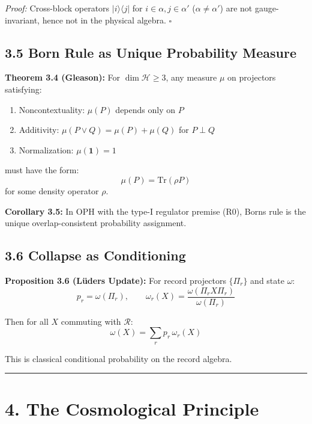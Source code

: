 \emph{Proof:} Cross-block operators \(|i\rangle\langle j|\) for \(i \in \alpha, j \in \alpha'\) (\(\alpha \neq \alpha'\)) are not gauge-invariant, hence not in the physical algebra. \(\square\)

\subsection{3.5 Born Rule as Unique Probability Measure}\label{35-born-rule-as-unique-probability-measure}

\textbf{Theorem 3.4 (Gleason):} For \(\dim \mathcal{H} \geq 3\), any measure \(\mu\) on projectors satisfying:

\begin{enumerate}
\def\labelenumi{\arabic{enumi}.}
\tightlist
\item
  Noncontextuality: \(\mu(P)\) depends only on \(P\)
\item
  Additivity: \(\mu(P \vee Q) = \mu(P) + \mu(Q)\) for \(P \perp Q\)
\item
  Normalization: \(\mu(\mathbf{1}) = 1\)
\end{enumerate}

must have the form: \[\mu(P) = \text{Tr}(\rho P)\] for some density operator \(\rho\).

\textbf{Corollary 3.5:} In OPH with the type-I regulator premise (R0), Born\textquotesingle s rule is the unique overlap-consistent probability assignment.

\subsection{3.6 Collapse as Conditioning}\label{36-collapse-as-conditioning}

\textbf{Proposition 3.6 (L\"{u}ders Update):} For record projectors \(\{\Pi_r\}\) and state \(\omega\): \[p_r = \omega(\Pi_r), \qquad \omega_r(X) = \frac{\omega(\Pi_r X \Pi_r)}{\omega(\Pi_r)}\]

Then for all \(X\) commuting with \(\mathcal{R}\): \[\omega(X) = \sum_r p_r \, \omega_r(X)\]

This is classical conditional probability on the record algebra.

\begin{center}\rule{0.5\linewidth}{0.5pt}\end{center}

\section{4. The Cosmological Principle}\label{4-the-cosmological-principle}

